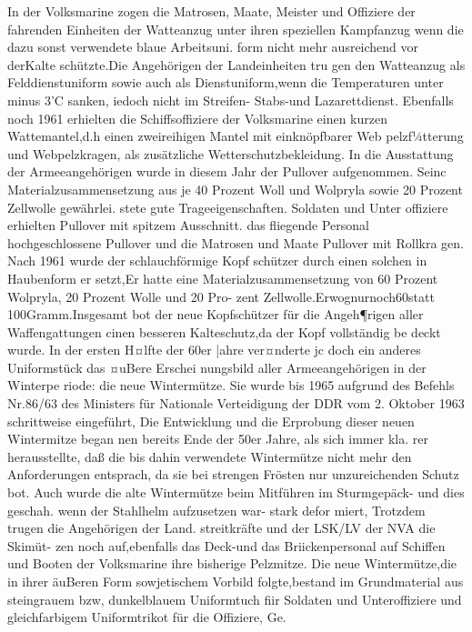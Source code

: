 In der Volksmarine zogen die Matrosen, Maate,
Meister und Offiziere der fahrenden Einheiten der
Watteanzug unter ihren speziellen Kampfanzug
wenn die dazu sonst verwendete blaue Arbeitsuni.
form nicht mehr ausreichend vor derKalte
schützte.Die Angehörigen der Landeinheiten tru
gen den Watteanzug als Felddienstuniform sowie
auch als Dienstuniform,wenn die Temperaturen
unter minus 3'C sanken, iedoch nicht im Streifen-
Stabs-und Lazarettdienst.
Ebenfalls noch 1961 erhielten die Schiffsoffiziere
der Volksmarine einen kurzen Wattemantel,d.h
einen zweireihigen Mantel mit einknöpfbarer Web
pelzf¼tterung und Webpelzkragen, als zusätzliche
Wetterschutzbekleidung.
In die Ausstattung der Armeeangehörigen wurde
in diesem Jahr der Pullover aufgenommen. Seinc
Materialzusammensetzung aus je 40 Prozent Woll
und Wolpryla sowie 20 Prozent Zellwolle gewährlei.
stete gute Trageeigenschaften. Soldaten und Unter
offiziere erhielten Pullover mit spitzem Ausschnitt.
das fliegende Personal hochgeschlossene Pullover
und die Matrosen und Maate Pullover mit Rollkra
gen.
Nach 1961 wurde der schlauchförmige Kopf
schützer durch einen solchen in Haubenform er
setzt,Er hatte eine Materialzusammensetzung von
60 Prozent Wolpryla, 20 Prozent Wolle und 20 Pro-
zent Zellwolle.Erwognurnoch60statt
100Gramm.Insgesamt bot der neue Kopfschützer
für die Angeh¶rigen aller Waffengattungen cinen
besseren Kalteschutz,da der Kopf vollständig be
deckt wurde.
In der ersten H¤lfte der 60er |ahre ver¤nderte jc
doch ein anderes Uniformstück das ¤uBere Erschei
nungsbild aller Armeeangehörigen in der Winterpe
riode: die neue Wintermütze. Sie wurde bis 1965
aufgrund des Befehls Nr.86/63 des Ministers für
Nationale Verteidigung der DDR vom 2. Oktober
1963 schrittweise eingeführt, Die Entwicklung und
die Erprobung dieser neuen Wintermitze began
nen bereits Ende der 50er Jahre, als sich immer kla.
rer herausstellte, daß die bis dahin verwendete Wintermütze nicht mehr den Anforderungen entsprach,
da sie bei strengen Frösten nur unzureichenden
Schutz bot. Auch wurde die alte Wintermütze beim
Mitführen im Sturmgepäck- und dies geschah.
wenn der Stahlhelm aufzusetzen war- stark defor
miert, Trotzdem trugen die Angehörigen der Land.
streitkräfte und der LSK/LV der NVA die Skimüt-
zen noch auf,ebenfalls das Deck-und das
Briickenpersonal auf Schiffen und Booten der
Volksmarine ihre bisherige Pelzmitze.
Die neue Wintermütze,die in ihrer äuBeren
Form sowjetischem Vorbild folgte,bestand im
Grundmaterial aus steingrauem bzw, dunkelblauem
Uniformtuch fiir Soldaten und Unteroffiziere und
gleichfarbigem Uniformtrikot für die Offiziere, Ge.
